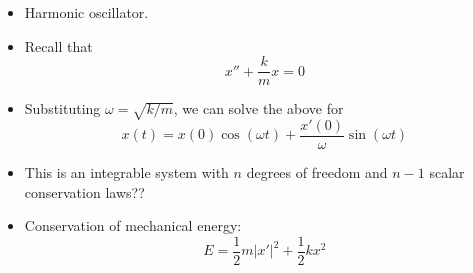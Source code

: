 \documentclass[../notes.tex]{subfiles}
\begin{document}
\begin{itemize}
\begin{itemize}
    \end{itemize}
    \item Harmonic oscillator.
    \item Recall that
    \begin{equation*}
        x''+\frac{k}{m}x = 0
    \end{equation*}
    \item Substituting $\omega=\sqrt{k/m}$, we can solve the above for
    \begin{equation*}
        x(t) = x(0)\cos(\omega t)+\frac{x'(0)}{\omega}\sin(\omega t)
    \end{equation*}
    \item This is an integrable system with $n$ degrees of freedom and $n-1$ scalar conservation laws??
    \item Conservation of mechanical energy:
    \begin{equation*}
        E = \frac{1}{2}m|x'|^2+\frac{1}{2}kx^2
    \end{equation*}
    \begin{figure}[h!]
        \centering
\end{figure}
\end{itemize}
\end{document}
